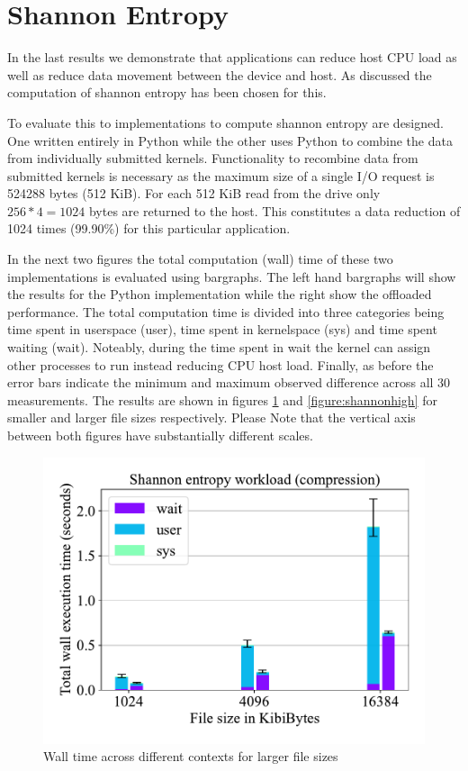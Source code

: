 \section{Shannon Entropy}

In the last results we demonstrate that applications can reduce host CPU load
as well as reduce data movement between the device and host. As discussed the
computation of shannon entropy has been chosen for this.

To evaluate this to implementations to compute shannon entropy are designed.
One written entirely in Python while the other uses Python to combine the
data from individually submitted kernels. Functionality to recombine data from
submitted kernels is necessary as the maximum size of a single I/O request is
524288 bytes (512 KiB). For each 512 KiB read from the drive only
$256 * 4=1024$ bytes are returned to the host. This constitutes a data reduction
of 1024 times (99.90\%) for this particular application.

In the next two figures the total computation (wall) time of these two
implementations is evaluated using bargraphs. The left hand bargraphs will show
the results for the Python implementation while the right show the offloaded
performance. The total computation time is divided into three categories being
time spent in userspace (user), time spent in kernelspace (sys) and time spent
waiting (wait). Noteably, during the time spent in wait the kernel can assign
other processes to run instead reducing CPU host load. Finally, as before the
error bars indicate the minimum and maximum observed difference across all 30
measurements. The results are shown in figures \ref{figure:shannonlow} and
\ref{figure:shannonhigh} for smaller and larger file sizes respectively. Please
Note that the vertical axis between both figures have substantially different
scales.

\begin{figure}[h]
    \centering
	\includegraphics[width=1\textwidth]{resources/images/results-shannon-lower.pdf}
	\caption{Wall time across different contexts for larger file sizes}
    \label{figure:shannonlow}
\end{figure}

